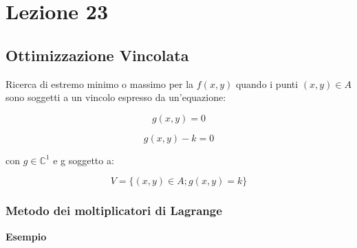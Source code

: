 \documentclass[../appunti-analisi.tex]{subfiles}
\begin{document}
\section{Lezione 23}

\subsection{Ottimizzazione Vincolata}

Ricerca di estremo minimo o massimo per la $f(x,y)$ quando i punti $(x,y) \in A$ sono soggetti a un vincolo espresso da un'equazione:

\[
    g(x,y) = 0
\]

\[
    g(x,y) -k = 0
\]

con $g \in \mathbb{C}^{1}$ e g soggetto a:

\[
    V= \{(x,y) \in A; g(x,y) =k\}
\]

%
%
%
%
%
%
%
%
%
%
%
%
%
\subsubsection{Metodo dei moltiplicatori di Lagrange}

\textbf{Esempio} 
\end{document}
